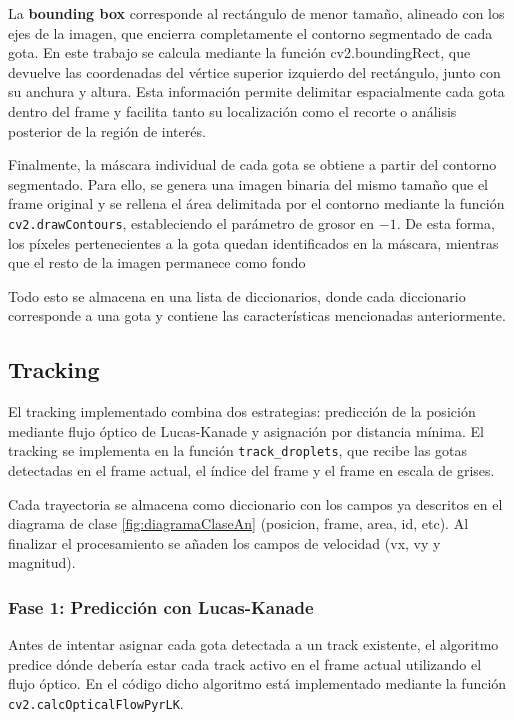 La \textbf{bounding box} corresponde al rectángulo de menor tamaño, alineado con los ejes de la imagen, que encierra completamente el contorno segmentado de cada gota. En este trabajo se calcula mediante la función cv2.boundingRect, que devuelve las coordenadas del vértice superior izquierdo del rectángulo, junto con su anchura y altura. Esta información permite delimitar espacialmente cada gota dentro del frame y facilita tanto su localización como el recorte o análisis posterior de la región de interés.

Finalmente, la máscara individual de cada gota se obtiene a partir del contorno segmentado. Para ello, se genera una imagen binaria del mismo tamaño que el frame original y se rellena el área delimitada por el contorno mediante la función \texttt{cv2.drawContours}, estableciendo el parámetro de grosor en $-1$. De esta forma, los píxeles pertenecientes a la gota quedan identificados en la máscara, mientras que el resto de la imagen permanece como fondo

Todo esto se almacena en una lista de diccionarios, donde cada diccionario corresponde a una gota y contiene las características mencionadas anteriormente. 

\subsection{Tracking}
El tracking implementado combina dos estrategias: predicción de la posición mediante flujo óptico de Lucas-Kanade \cite{lucas1981iterative} y asignación por distancia mínima. El tracking se implementa en la función \texttt{track\_droplets}, que recibe las gotas detectadas en el frame actual, el índice del frame y el frame en escala de grises.

Cada trayectoria se almacena como diccionario con los campos ya descritos en el diagrama de clase \ref{fig:diagramaClaseAn} (posicion, frame, area, id, etc). Al finalizar el procesamiento se añaden los campos de velocidad (vx, vy y magnitud).

\subsubsection{Fase 1: Predicción con Lucas-Kanade}

Antes de intentar asignar cada gota detectada a un track existente, el algoritmo predice dónde debería estar cada track activo en el frame actual utilizando el flujo óptico. En el código dicho algoritmo está implementado mediante la función \texttt{cv2.calcOpticalFlowPyrLK}.

